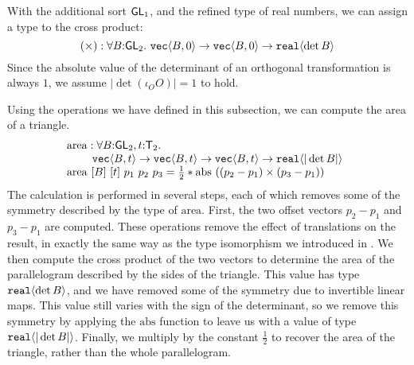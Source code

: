With the additional sort $\mathsf{GL}_1$, and the refined type of real
numbers, we can assign a type to the cross product:
\begin{displaymath}
  (\times) : \forall B \mathord: \mathsf{GL}_2.\ \texttt{vec}\langle B,0 \rangle \to \texttt{vec}\langle B,0 \rangle \to \texttt{real}\langle \det B \rangle
\end{displaymath}
Since the absolute value of the determinant of an orthogonal
transformation is always $1$, we assume $|\det (\iota_O O)| = 1$ to
hold.

\begin{example}\label{ex:area-of-triangle-1}
  Using the operations we have defined in this subsection, we can
  compute the area of a triangle. 
  \begin{displaymath}
    \begin{array}{@{}l}
      \mathrm{area} : \forall B\mathord:\SynGL_2, t\mathord:\SynTransl_2.\ \\
      \hspace{0.8cm}\tyPrim{vec}{B, t} \to \tyPrim{vec}{B, t} \to \tyPrim{vec}{B, t} \to \tyPrim{real}{|\det B|} \\
      \mathrm{area}\ [B]\ [t]\ p_1\ p_2\ p_3 = \frac{1}{2} * \mathrm{abs}\ ((p_2 - p_1) \times (p_3 - p_1))
    \end{array}
  \end{displaymath}
  The calculation is performed in several steps, each of which removes
  some of the symmetry described by the type of
  $\mathrm{area}$. First, the two offset vectors $p_2 - p_1$ and $p_3
  - p_1$ are computed. These operations remove the effect of
  translations on the result, in exactly the same way as the type
  isomorphism we introduced in . We then compute
  the cross product of the two vectors to determine the area of the
  parallelogram described by the sides of the triangle. This value has
  type $\texttt{real}\langle \det B \rangle$, and we have removed some of the
  symmetry due to invertible linear maps. This value still varies with
  the sign of the determinant, so we remove this symmetry by applying
  the $\mathrm{abs}$ function to leave us with a value of type
  $\texttt{real}\langle |\det B| \rangle$. Finally, we multiply by the constant
  $\frac{1}{2}$ to recover the area of the triangle, rather than the
  whole parallelogram.


\end{example}
